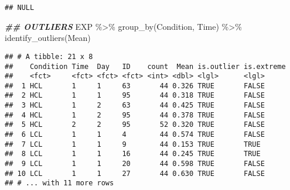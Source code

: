 \documentclass[
]{article}
\newenvironment{Shaded}{\begin{snugshade}}{\end{snugshade}}
\newcommand{\AttributeTok}[1]{\textcolor[rgb]{0.77,0.63,0.00}{#1}}
\newcommand{\ConstantTok}[1]{\textcolor[rgb]{0.00,0.00,0.00}{#1}}
\newcommand{\DocumentationTok}[1]{\textcolor[rgb]{0.56,0.35,0.01}{\textbf{\textit{#1}}}}
\newcommand{\FunctionTok}[1]{\textcolor[rgb]{0.00,0.00,0.00}{#1}}
\newcommand{\NormalTok}[1]{#1}
\newcommand{\OtherTok}[1]{\textcolor[rgb]{0.56,0.35,0.01}{#1}}
\newcommand{\SpecialCharTok}[1]{\textcolor[rgb]{0.00,0.00,0.00}{#1}}
\newcommand{\StringTok}[1]{\textcolor[rgb]{0.31,0.60,0.02}{#1}}
\begin{document}
\begin{Shaded}
\end{Shaded}

\begin{verbatim}
## NULL
\end{verbatim}

\begin{Shaded}
\begin{Highlighting}[]
\DocumentationTok{\#\# OUTLIERS}
\NormalTok{EXP }\SpecialCharTok{\%\textgreater{}\%}
  \FunctionTok{group\_by}\NormalTok{(Condition, Time) }\SpecialCharTok{\%\textgreater{}\%}
  \FunctionTok{identify\_outliers}\NormalTok{(Mean)}
\end{Highlighting}
\end{Shaded}

\begin{verbatim}
## # A tibble: 21 x 8
##    Condition Time  Day   ID    count  Mean is.outlier is.extreme
##    <fct>     <fct> <fct> <fct> <int> <dbl> <lgl>      <lgl>     
##  1 HCL       1     1     63       44 0.326 TRUE       FALSE     
##  2 HCL       1     1     95       44 0.318 TRUE       FALSE     
##  3 HCL       1     2     63       44 0.425 TRUE       FALSE     
##  4 HCL       1     2     95       44 0.378 TRUE       FALSE     
##  5 HCL       2     2     95       52 0.320 TRUE       FALSE     
##  6 LCL       1     1     4        44 0.574 TRUE       FALSE     
##  7 LCL       1     1     9        44 0.153 TRUE       TRUE      
##  8 LCL       1     1     16       44 0.245 TRUE       TRUE      
##  9 LCL       1     1     20       44 0.598 TRUE       FALSE     
## 10 LCL       1     1     27       44 0.630 TRUE       FALSE     
## # ... with 11 more rows
\end{verbatim}

\begin{Shaded}
\end{Shaded}
\end{document}
